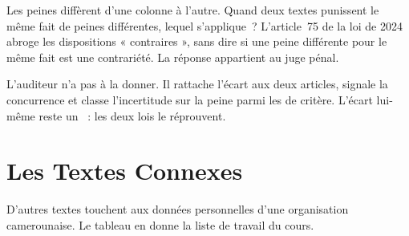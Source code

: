 Les peines diffèrent d'une colonne à l'autre. Quand deux textes punissent le
même fait de peines différentes, lequel s'applique~? L'article~75 de la loi
de 2024 abroge les dispositions « contraires », sans dire si une peine
différente pour le même fait est une contrariété. La réponse appartient au
juge pénal.

L'auditeur n'a pas à la donner. Il rattache l'écart aux deux articles,
signale la concurrence et classe l'incertitude sur la peine parmi les
\NEK{} de critère. L'écart lui-même reste un \NON{}~: les deux lois le
réprouvent.

\section{Les Textes Connexes}
\label{sec:c07-connexes}

D'autres textes touchent aux données personnelles d'une organisation
camerounaise. Le tableau en donne la liste de travail du cours.

